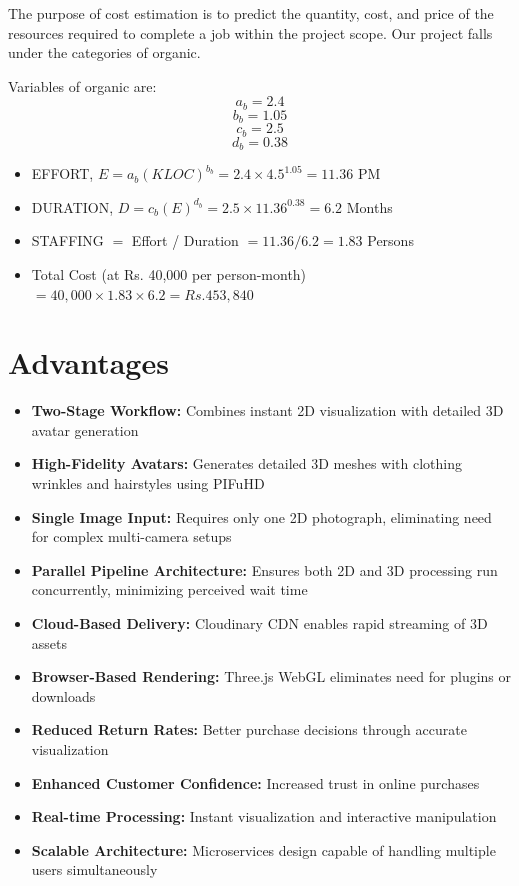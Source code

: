 \documentclass[12pt,a4paper,oneside]{report}
\begin{document}
The purpose of cost estimation is to predict the quantity, cost, and price of the resources required to complete a job within the project scope. Our project falls under the categories of organic.

Variables of organic are:
\[a_b = 2.4\]
\[b_b = 1.05\]
\[c_b = 2.5\]
\[d_b = 0.38\]

\begin{itemize}
    \item EFFORT, \(E = a_b(KLOC)^{b_b} = 2.4 \times 4.5^{1.05} = 11.36\) PM
    \item DURATION, \(D = c_b(E)^{d_b} = 2.5 \times 11.36^{0.38} = 6.2\) Months
    \item STAFFING \(=\) Effort / Duration \(= 11.36 / 6.2 = 1.83\) Persons
    \item Total Cost (at Rs. 40,000 per person-month) \(= 40,000 \times 1.83 \times 6.2 = Rs. 453,840\)
\end{itemize}

\section{Advantages}

\begin{itemize}
    \item \textbf{Two-Stage Workflow:} Combines instant 2D visualization with detailed 3D avatar generation
    \item \textbf{High-Fidelity Avatars:} Generates detailed 3D meshes with clothing wrinkles and hairstyles using PIFuHD
    \item \textbf{Single Image Input:} Requires only one 2D photograph, eliminating need for complex multi-camera setups
    \item \textbf{Parallel Pipeline Architecture:} Ensures both 2D and 3D processing run concurrently, minimizing perceived wait time
    \item \textbf{Cloud-Based Delivery:} Cloudinary CDN enables rapid streaming of 3D assets
    \item \textbf{Browser-Based Rendering:} Three.js WebGL eliminates need for plugins or downloads
    \item \textbf{Reduced Return Rates:} Better purchase decisions through accurate visualization
    \item \textbf{Enhanced Customer Confidence:} Increased trust in online purchases
    \item \textbf{Real-time Processing:} Instant visualization and interactive manipulation
    \item \textbf{Scalable Architecture:} Microservices design capable of handling multiple users simultaneously
\end{itemize}
\end{document}
